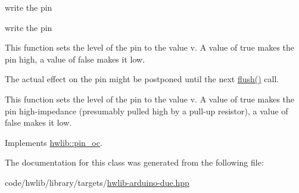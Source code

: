 write the pin

write the pin

This function sets the level of the pin to the value v. A value of true makes the pin high, a value of false makes it low.

The actual effect on the pin might be postponed until the next \hyperlink{classdue_1_1pin__oc_a911e67dbcc0005b3eae0d511f576a215}{flush()} call.

This function sets the level of the pin to the value v. A value of true makes the pin high-\/impedance (presumably pulled high by a pull-\/up resistor), a value of false makes it low. 

Implements \hyperlink{classhwlib_1_1pin__oc_a4429dd7dc80858a213bb157f4ac5def3}{hwlib\+::pin\+\_\+oc}.



The documentation for this class was generated from the following file\+:\begin{DoxyCompactItemize}
\item 
code/hwlib/library/targets/\hyperlink{hwlib-arduino-due_8hpp}{hwlib-\/arduino-\/due.\+hpp}\end{DoxyCompactItemize}
